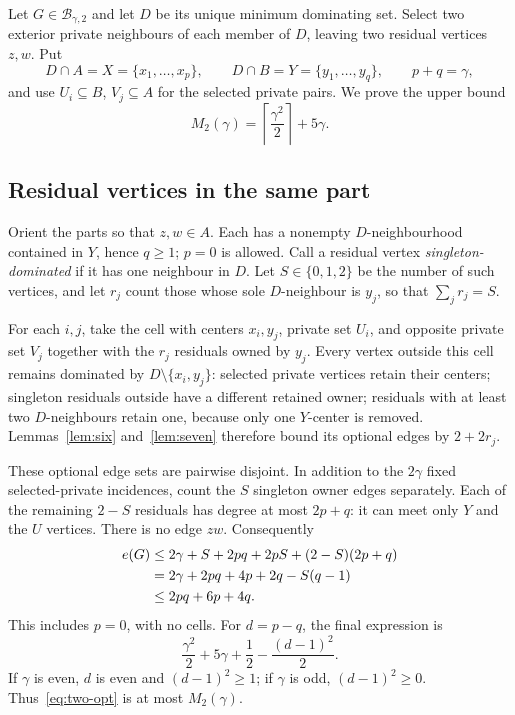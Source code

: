 \documentclass[11pt]{article}
\theoremstyle{definition}
\theoremstyle{remark}
\newcommand{\e}{e}
\newcommand{\ceil}[1]{\left\lceil#1\right\rceil}
\begin{document}
Let $G\in\mathcal B_{\gamma,2}$ and let $D$ be its unique minimum dominating
set. Select two exterior private neighbours of each member of $D$, leaving
two residual vertices $z,w$. Put
\[
 D\cap A=X=\{x_1,\ldots,x_p\},\qquad
 D\cap B=Y=\{y_1,\ldots,y_q\},\qquad p+q=\gamma,
\]
and use $U_i\subseteq B$, $V_j\subseteq A$ for the selected private pairs.
We prove the upper bound
\[
 M_2(\gamma)=\ceil{\frac{\gamma^2}{2}}+5\gamma.
\]

\subsection{Residual vertices in the same part}

Orient the parts so that $z,w\in A$. Each has a nonempty $D$-neighbourhood
contained in $Y$, hence $q\ge1$; $p=0$ is allowed. Call a residual vertex
\emph{singleton-dominated} if it has one neighbour in $D$. Let $S\in\{0,1,2\}$
be the number of such vertices, and let $r_j$ count those whose sole
$D$-neighbour is $y_j$, so that $\sum_jr_j=S$.

For each $i,j$, take the cell with centers $x_i,y_j$, private set $U_i$,
and opposite private set $V_j$ together with the $r_j$ residuals owned by
$y_j$. Every vertex outside this cell remains dominated by
$D\setminus\{x_i,y_j\}$: selected private vertices retain their centers;
singleton residuals outside have a different retained owner; residuals
with at least two $D$-neighbours retain one, because only one $Y$-center
is removed. Lemmas~\ref{lem:six} and~\ref{lem:seven} therefore bound its
optional edges by $2+2r_j$.

These optional edge sets are pairwise disjoint. In addition to the
$2\gamma$ fixed selected-private incidences, count the $S$ singleton owner
edges separately. Each of the remaining $2-S$ residuals has degree at most
$2p+q$: it can meet only $Y$ and the $U$ vertices. There is no edge $zw$.
Consequently
\begin{align}
 \e(G)&\le 2\gamma+S+2pq+2pS+(2-S)(2p+q)\notag\\
       &=2\gamma+2pq+4p+2q-S(q-1)\notag\\
       &\le 2pq+6p+4q.\label{eq:two-same}
\end{align}
This includes $p=0$, with no cells. For $d=p-q$, the final expression is
\begin{equation}\label{eq:two-opt}
 \frac{\gamma^2}{2}+5\gamma+\frac12-\frac{(d-1)^2}{2}.
\end{equation}
If $\gamma$ is even, $d$ is even and $(d-1)^2\ge1$; if $\gamma$ is odd,
$(d-1)^2\ge0$. Thus~\eqref{eq:two-opt} is at most $M_2(\gamma)$.
\end{document}
